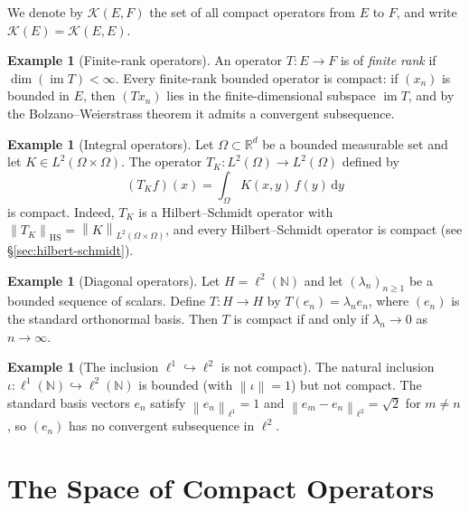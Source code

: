\documentclass[a4paper,12pt]{book}
\DeclareMathOperator{\im}{im}
\newcommand{\N}{\mathbb{N}}
\newcommand{\R}{\mathbb{R}}
\newcommand{\dd}{\mathrm{d}}
\newcommand{\norm}[1]{\left\| #1 \right\|}
\theoremstyle{definition}
\newtheorem{example}[definition]{Example}
\theoremstyle{plain}
\theoremstyle{remark}
\begin{document}
We denote by $\mathcal{K}(E, F)$ the set of all compact operators from $E$ to $F$,
and write $\mathcal{K}(E) = \mathcal{K}(E, E)$.

\begin{example}[Finite-rank operators]\label{ex:finite-rank-compact}
An operator $T \colon E \to F$ is of \emph{finite rank} if $\dim(\im T) < \infty$.
Every finite-rank bounded operator is compact: if $(x_n)$ is bounded in $E$,
then $(Tx_n)$ lies in the finite-dimensional subspace $\im T$, and by the
Bolzano--Weierstrass theorem it admits a
convergent subsequence.
\end{example}

\begin{example}[Integral operators]\label{ex:integral-compact}
Let $\Omega \subset \R^d$ be a bounded measurable set and let
$K \in L^2(\Omega \times \Omega)$. The operator $T_K \colon L^2(\Omega) \to L^2(\Omega)$
defined by
\[
  (T_K f)(x) = \int_\Omega K(x, y)\, f(y)\, \dd y
\]
is compact. Indeed, $T_K$ is a Hilbert--Schmidt operator with
$\norm{T_K}_{\mathrm{HS}} = \norm{K}_{L^2(\Omega \times \Omega)}$, and every
Hilbert--Schmidt operator is compact (see \S\ref{sec:hilbert-schmidt}).
\end{example}

\begin{example}[Diagonal operators]\label{ex:diagonal-compact}
Let $H = \ell^2(\N)$ and let $(\lambda_n)_{n \ge 1}$ be a bounded sequence of
scalars. Define $T \colon H \to H$ by $T(e_n) = \lambda_n e_n$, where $(e_n)$
is the standard orthonormal basis. Then $T$ is compact if and only if
$\lambda_n \to 0$ as $n \to \infty$.
\end{example}

\begin{example}[The inclusion $\ell^1 \hookrightarrow \ell^2$ is not compact]
\label{ex:non-compact}
The natural inclusion $\iota \colon \ell^1(\N) \hookrightarrow \ell^2(\N)$
is bounded (with $\norm{\iota} = 1$) but not compact. The standard basis
vectors $e_n$ satisfy $\norm{e_n}_{\ell^1} = 1$ and
$\norm{e_m - e_n}_{\ell^2} = \sqrt{2}$ for $m \ne n$, so $(e_n)$ has no
convergent subsequence in $\ell^2$.
\end{example}

\section{The Space of Compact Operators}\label{sec:compact-space}
\end{document}
